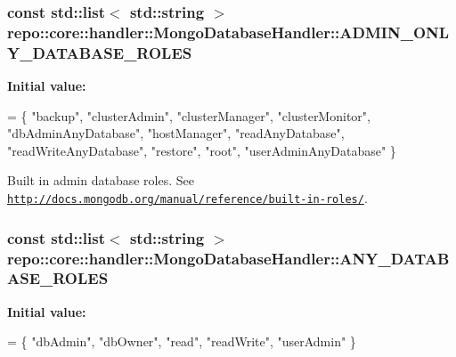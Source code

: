 \subsubsection[{A\+D\+M\+I\+N\+\_\+\+O\+N\+L\+Y\+\_\+\+D\+A\+T\+A\+B\+A\+S\+E\+\_\+\+R\+O\+L\+E\+S}]{\setlength{\rightskip}{0pt plus 5cm}const std\+::list$<$ std\+::string $>$ repo\+::core\+::handler\+::\+Mongo\+Database\+Handler\+::\+A\+D\+M\+I\+N\+\_\+\+O\+N\+L\+Y\+\_\+\+D\+A\+T\+A\+B\+A\+S\+E\+\_\+\+R\+O\+L\+E\+S\hspace{0.3cm}{\ttfamily [static]}}\label{classrepo_1_1core_1_1handler_1_1_mongo_database_handler_aef93abfc2e7cdf3108aa8cc170c2cc69}
{\bfseries Initial value\+:}
\begin{DoxyCode}
=
\{ \textcolor{stringliteral}{"backup"}, \textcolor{stringliteral}{"clusterAdmin"}, \textcolor{stringliteral}{"clusterManager"}, \textcolor{stringliteral}{"clusterMonitor"}, \textcolor{stringliteral}{"dbAdminAnyDatabase"},
\textcolor{stringliteral}{"hostManager"}, \textcolor{stringliteral}{"readAnyDatabase"}, \textcolor{stringliteral}{"readWriteAnyDatabase"}, \textcolor{stringliteral}{"restore"}, \textcolor{stringliteral}{"root"},
\textcolor{stringliteral}{"userAdminAnyDatabase"} \}
\end{DoxyCode}


Built in admin database roles. See \href{http://docs.mongodb.org/manual/reference/built-in-roles/}{\tt http\+://docs.\+mongodb.\+org/manual/reference/built-\/in-\/roles/}. 

\hypertarget{classrepo_1_1core_1_1handler_1_1_mongo_database_handler_a963d231d4bb42ae5ac36f70eddbb8068}{}
\subsubsection[{A\+N\+Y\+\_\+\+D\+A\+T\+A\+B\+A\+S\+E\+\_\+\+R\+O\+L\+E\+S}]{\setlength{\rightskip}{0pt plus 5cm}const std\+::list$<$ std\+::string $>$ repo\+::core\+::handler\+::\+Mongo\+Database\+Handler\+::\+A\+N\+Y\+\_\+\+D\+A\+T\+A\+B\+A\+S\+E\+\_\+\+R\+O\+L\+E\+S\hspace{0.3cm}{\ttfamily [static]}}\label{classrepo_1_1core_1_1handler_1_1_mongo_database_handler_a963d231d4bb42ae5ac36f70eddbb8068}
{\bfseries Initial value\+:}
\begin{DoxyCode}
=
\{ \textcolor{stringliteral}{"dbAdmin"}, \textcolor{stringliteral}{"dbOwner"}, \textcolor{stringliteral}{"read"}, \textcolor{stringliteral}{"readWrite"}, \textcolor{stringliteral}{"userAdmin"} \}
\end{DoxyCode}


